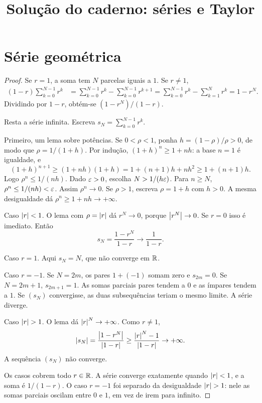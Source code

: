 \documentclass[11pt,a4paper]{article}
\title{Solução do caderno: séries e Taylor}
\author{}
\date{}
\begin{document}
\maketitle
\tableofcontents

\section{Série geométrica}

\begin{proof}
Se \(r=1\), a soma tem \(N\) parcelas iguais a \(1\). Se \(r\neq 1\),
\begin{align*}
(1-r)\sum_{k=0}^{N-1} r^k
&=\sum_{k=0}^{N-1} r^k-\sum_{k=0}^{N-1} r^{k+1}
=\sum_{k=0}^{N-1} r^k-\sum_{k=1}^{N} r^k
=1-r^N.
\end{align*}
Dividindo por \(1-r\), obtém-se \((1-r^N)/(1-r)\).

Resta a série infinita. Escreva \(s_N=\sum_{k=0}^{N-1} r^k\).

Primeiro, um lema sobre potências. Se \(0<\rho<1\), ponha \(h=(1-\rho)/\rho>0\), de modo que \(\rho=1/(1+h)\). Por indução, \((1+h)^n\ge 1+nh\): a base \(n=1\) é igualdade, e
\[
(1+h)^{n+1}\ge(1+nh)(1+h)=1+(n+1)h+nh^2\ge 1+(n+1)h.
\]
Logo \(\rho^n\le 1/(nh)\). Dado \(\varepsilon>0\), escolha \(N>1/(h\varepsilon)\). Para \(n\ge N\), \(\rho^n\le 1/(nh)<\varepsilon\). Assim \(\rho^n\to 0\). Se \(\rho>1\), escreva \(\rho=1+h\) com \(h>0\). A mesma desigualdade dá \(\rho^n\ge 1+nh\to+\infty\).

Caso \(\left\lvert r \right\rvert<1\). O lema com \(\rho=\left\lvert r \right\rvert\) dá \(r^N\to 0\), porque \(\left\lvert r^N \right\rvert\to 0\). Se \(r=0\) isso é imediato. Então
\[
s_N=\frac{1-r^N}{1-r}\to\frac{1}{1-r}.
\]

Caso \(r=1\). Aqui \(s_N=N\), que não converge em \(\mathbb{R}\).

Caso \(r=-1\). Se \(N=2m\), os pares \(1+(-1)\) somam zero e \(s_{2m}=0\). Se \(N=2m+1\), \(s_{2m+1}=1\). As somas parciais pares tendem a \(0\) e as ímpares tendem a \(1\). Se \((s_N)\) convergisse, as duas subsequências teriam o mesmo limite. A série diverge.

Caso \(\left\lvert r \right\rvert>1\). O lema dá \(\left\lvert r \right\rvert^N\to+\infty\). Como \(r\neq 1\),
\[
\left\lvert s_N \right\rvert=\frac{\left\lvert 1-r^N \right\rvert}{\left\lvert 1-r \right\rvert}\ge\frac{\left\lvert r \right\rvert^N-1}{\left\lvert 1-r \right\rvert}\to+\infty.
\]
A sequência \((s_N)\) não converge.

Os casos cobrem todo \(r\in\mathbb{R}\). A série converge exatamente quando \(\left\lvert r \right\rvert<1\), e a soma é \(1/(1-r)\). O caso \(r=-1\) foi separado da desigualdade \(\left\lvert r \right\rvert>1\): nele as somas parciais oscilam entre \(0\) e \(1\), em vez de irem para infinito.
\end{proof}
\end{document}
